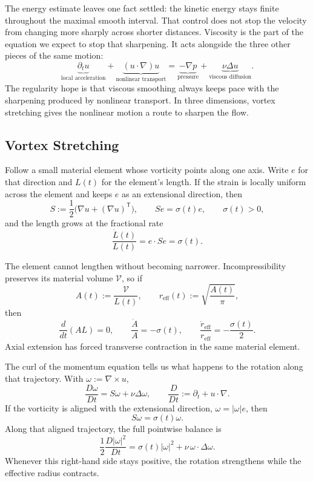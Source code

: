 
The energy estimate leaves one fact settled: the kinetic energy stays finite throughout the maximal smooth interval.
That control does not stop the velocity from changing more sharply across shorter distances.
Viscosity is the part of the equation we expect to stop that sharpening.
It acts alongside the three other pieces of the same motion:
\[
  \underbrace{\partial_t u}_{\text{local acceleration}}
  +
  \underbrace{(u\cdot\nabla)u}_{\text{nonlinear transport}}
  =
  \underbrace{-\nabla p}_{\text{pressure}}
  +
  \underbrace{\nu\Delta u}_{\text{viscous diffusion}}.
\]
The regularity hope is that viscous smoothing always keeps pace with the sharpening produced by nonlinear transport.
In three dimensions, vortex stretching gives the nonlinear motion a route to sharpen the flow.

\subsection{Vortex Stretching}\label{sub:ThePerfectlyStretchingVortex}

Follow a small material element whose vorticity points along one axis.
Write \(e\) for that direction and \(L(t)\) for the element's length.
If the strain is locally uniform across the element and keeps \(e\) as an extensional direction, then
\[
  S:=\frac12\bigl(\nabla u+(\nabla u)^{\mathsf T}\bigr),
  \qquad
  Se=\sigma(t)e,
  \qquad
  \sigma(t)>0,
\]
and the length grows at the fractional rate
\[
  \frac{\dot L(t)}{L(t)}
  =
  e\cdot Se
  =
  \sigma(t).
\]

The element cannot lengthen without becoming narrower.
Incompressibility preserves its material volume \(\mathcal V\), so if
\[
  A(t):=\frac{\mathcal V}{L(t)},
  \qquad
  r_{\mathrm{eff}}(t):=\sqrt{\frac{A(t)}{\pi}},
\]
then
\[
  \frac{d}{dt}(A L)=0,
  \qquad
  \frac{\dot A}{A}=-\sigma(t),
  \qquad
  \frac{\dot r_{\mathrm{eff}}}{r_{\mathrm{eff}}}
  =
  -\frac{\sigma(t)}{2}.
\]
Axial extension has forced transverse contraction in the same material element.

The curl of the momentum equation tells us what happens to the rotation along that trajectory.
With \(\omega:=\nabla\times u\),
\[
  \frac{D\omega}{Dt}
  =
  S\omega+\nu\Delta\omega,
  \qquad
  \frac{D}{Dt}:=\partial_t+u\cdot\nabla.
\]
If the vorticity is aligned with the extensional direction, \(\omega=|\omega|e\), then
\[
  S\omega=\sigma(t)\omega.
\]
Along that aligned trajectory, the full pointwise balance is
\[
  \frac12\frac{D|\omega|^2}{Dt}
  =
  \sigma(t)|\omega|^2
  +
  \nu\,\omega\cdot\Delta\omega.
\]
Whenever this right-hand side stays positive, the rotation strengthens while the effective radius contracts.


